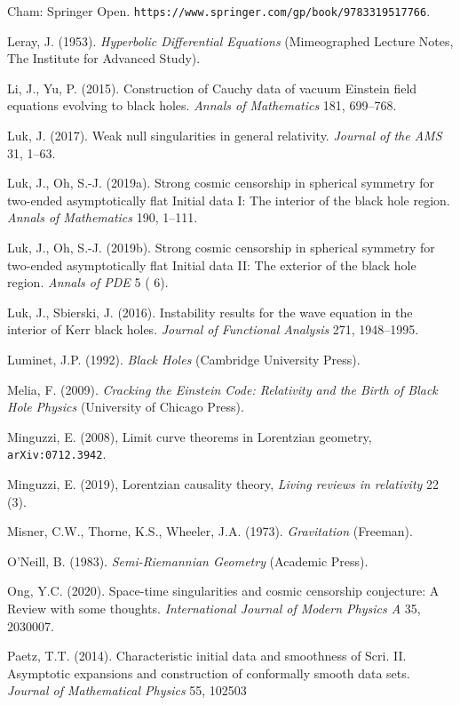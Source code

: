 \documentclass[11pt,a4paper]{article}
\begin{document}
\begin{small}
\begin{thebibliography}{99}
Cham: Springer Open. \verb#https://www.springer.com/gp/book/9783319517766#.
\item[]  Leray, J. (1953).
 \emph{Hyperbolic Differential Equations} (Mimeographed Lecture Notes, The Institute for Advanced Study).
 \item[] Li, J.,  Yu, P. (2015). Construction of Cauchy data of vacuum Einstein field equations evolving to black holes.
\emph{ Annals of Mathematics} 181, 699--768. 
\item[] Luk, J. (2017). Weak null singularities in general relativity. \emph{Journal of the AMS} 31, 1--63. 
\item[] Luk, J., Oh, S.-J. (2019a). 
Strong cosmic censorship in spherical symmetry for two-ended asymptotically flat Initial data I: The interior of the black hole region. \emph{Annals of Mathematics} 190, 1--111.
\item[] Luk, J., Oh, S.-J. (2019b). 
Strong cosmic censorship in spherical symmetry for two-ended asymptotically flat Initial data II: The exterior of the black hole region. \emph{Annals of PDE} 5 ( 6).
\item[] Luk, J., Sbierski, J. (2016). Instability results for the wave equation in the interior of Kerr black holes.
\emph{Journal of Functional Analysis} 271, 1948--1995. 
 \item[]  Luminet, J.P. (1992). \emph{Black Holes} (Cambridge University Press). 
 \item[] Melia, F. (2009). \emph{Cracking the Einstein Code: Relativity and the Birth of Black Hole Physics} (University of Chicago Press). 
 \item[]  Minguzzi, E. (2008), Limit curve theorems in Lorentzian geometry, \texttt{arXiv:0712.3942}.
\item[]  Minguzzi, E. (2019),  Lorentzian causality theory, \emph{Living reviews in relativity} 22 (3). 
 \item[] Misner, C.W., Thorne,  K.S.,  Wheeler, J.A. (1973). 
 \emph{Gravitation} (Freeman).
\item[]  O'Neill, B. (1983). \emph{Semi-Riemannian Geometry} (Academic Press).
\item[] Ong, Y.C. (2020). Space-time singularities and cosmic censorship conjecture: A Review with some thoughts.
\emph{International Journal of Modern Physics A} 35, 2030007. 
\item[]  Paetz, T.T. (2014). Characteristic initial data and smoothness of Scri. II. Asymptotic expansions and construction of conformally smooth data sets. \emph{Journal of Mathematical Physics}  55, 102503

\end{thebibliography}
\end{small}
\end{document}
